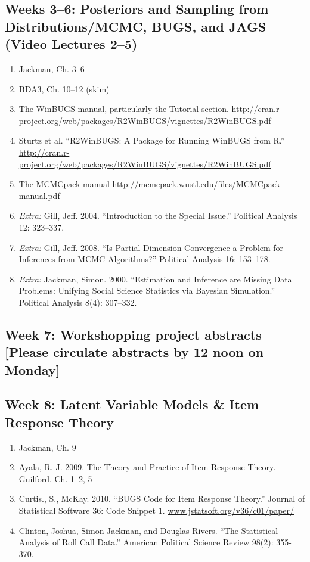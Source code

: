 \documentclass[11pt, leqno, fleqn]{article}
\begin{document}
\subsection*{Weeks 3--6: Posteriors and Sampling from Distributions/MCMC, BUGS, and JAGS (Video Lectures 2--5)} 
	\begin{enumerate}
	\item[] Jackman, Ch. 3--6
	\item[] BDA3, Ch. 10--12 (skim)
	\item[] The WinBUGS manual, particularly the Tutorial section. \url{http://cran.r-
project.org/web/packages/R2WinBUGS/vignettes/R2WinBUGS.pdf}
	\item[] Sturtz et al. ``R2WinBUGS: A Package for Running WinBUGS from R.'' \url{http://cran.r-project.org/web/packages/R2WinBUGS/vignettes/R2WinBUGS.pdf}
	\item[] The MCMCpack manual \url{http://mcmcpack.wustl.edu/files/MCMCpack-manual.pdf}
	\item[] {\em Extra:} Gill, Jeff. 2004. ``Introduction to the Special Issue.'' Political Analysis 12: 323--337.
	\item[] {\em Extra:} Gill, Jeff. 2008. ``Is Partial-Dimension Convergence a Problem for Inferences from MCMC Algorithms?'' Political Analysis 16: 153--178.
	\item[] {\em Extra:} Jackman, Simon. 2000. ``Estimation and Inference are Missing Data Problems: Unifying Social Science Statistics via Bayesian Simulation.'' Political Analysis 8(4): 307--332.
	\end{enumerate}
\subsection*{Week 7: Workshopping project abstracts [Please circulate abstracts by 12 noon on Monday]}
\subsection*{Week 8: Latent Variable Models \& Item Response Theory}
	\begin{enumerate}
	\item[] Jackman, Ch. 9
	\item[] Ayala, R. J. 2009. The Theory and Practice of Item Response Theory. Guilford. Ch. 1--2, 5
	\item[] Curtis., S., McKay. 2010. ``BUGS Code for Item Response Theory.'' Journal of
Statistical Software 36: Code Snippet 1. \url{
www.jstatsoft.org/v36/c01/paper/}
	\item[] Clinton, Joshua, Simon Jackman, and Douglas Rivers. ``The Statistical Analysis
of Roll Call Data.'' American Political Science Review 98(2): 355-370.
	\end{enumerate}
\end{document}
